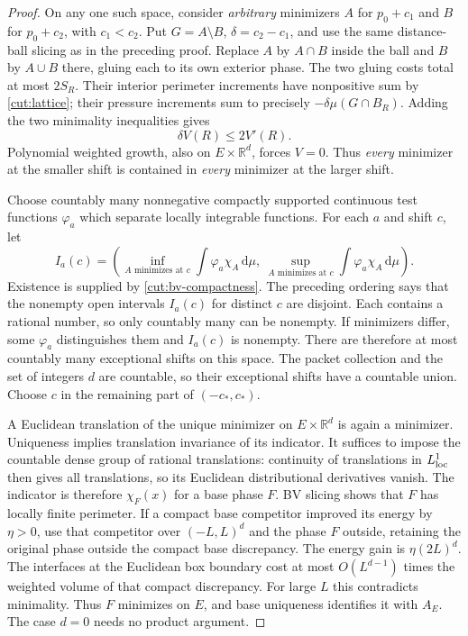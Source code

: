 \documentclass[11pt]{article}
\numberwithin{equation}{section}
\theoremstyle{definition}
\theoremstyle{remark}
\begin{document}
\begin{proof}
On any one such space, consider \emph{arbitrary} minimizers $A$ for
$p_0+c_1$ and $B$ for $p_0+c_2$, with $c_1<c_2$.  Put
$G=A\setminus B$, $\delta=c_2-c_1$, and use the same distance-ball
slicing as in the preceding proof.  Replace $A$ by $A\cap B$ inside the
ball and $B$ by $A\cup B$ there, gluing each to its own exterior phase.
The two gluing costs total at most $2S_R$.  Their interior perimeter
increments have nonpositive sum by \eqref{cut:lattice}; their pressure
increments sum to precisely $-\delta\mu(G\cap B_R)$.  Adding the two
minimality inequalities gives
\begin{equation}\label{cut:ordering-volume}
                 \delta V(R)\le2V'(R).
\end{equation}
Polynomial weighted growth, also on $E\times\mathbb R^d$, forces $V=0$.
Thus \emph{every} minimizer at the smaller shift is contained in
\emph{every} minimizer at the larger shift.

Choose countably many nonnegative compactly supported continuous test
functions $\varphi_a$ which separate locally integrable functions.
For each $a$ and shift $c$, let
\[
 I_a(c)=\left(\inf_{A\text{ minimizes at }c}
                 \int\varphi_a\chi_A\,\mathrm d\mu,
              \ \sup_{A\text{ minimizes at }c}
                 \int\varphi_a\chi_A\,\mathrm d\mu\right).
\]
Existence is supplied by \cref{cut:bv-compactness}.  The preceding
ordering says that the nonempty open intervals $I_a(c)$ for distinct
$c$ are disjoint.  Each contains a rational number, so only countably
many can be nonempty.  If minimizers differ, some $\varphi_a$ distinguishes
them and $I_a(c)$ is nonempty.  There are therefore at most countably
many exceptional shifts on this space.  The packet collection and the
set of integers $d$ are countable, so their exceptional shifts have a
countable union.  Choose $c$ in the remaining part of $(-c_*,c_*)$.

A Euclidean translation of the unique minimizer on $E\times\mathbb R^d$ is
again a minimizer.  Uniqueness implies translation invariance of its
indicator.  It suffices to impose the countable dense group of rational
translations: continuity of translations in $L^1_{\rm loc}$ then gives
all translations, so its Euclidean distributional derivatives vanish.
The indicator is therefore $\chi_F(x)$ for a base phase $F$.
BV slicing shows that $F$ has locally finite perimeter.  If a compact
base competitor improved its energy by $\eta>0$, use that competitor
over $(-L,L)^d$ and the phase $F$ outside, retaining the original phase
outside the compact base discrepancy.  The energy gain is
$\eta(2L)^d$.  The interfaces at the Euclidean box boundary cost at most
$O(L^{d-1})$ times the weighted volume of that compact discrepancy.
For large $L$ this contradicts minimality.  Thus $F$ minimizes on $E$,
and base uniqueness identifies it with $A_E$.  The case $d=0$ needs
no product argument.
\end{proof}
\end{document}
